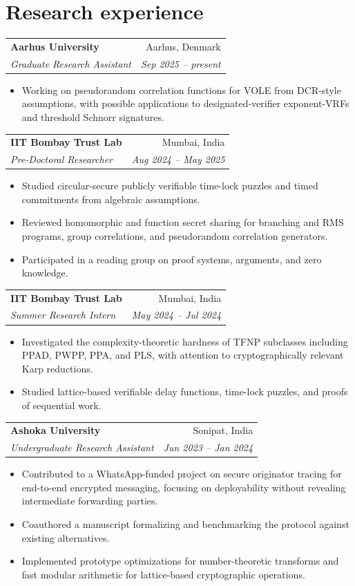 \documentclass[10pt,a4paper]{article}
\makeatletter
\newcommand{\cvheading}[4]{%
  \begin{tabular*}{\textwidth}{@{\extracolsep{\fill}} l r}
    \textbf{#1} & #2 \\
    \emph{#3} & \emph{#4}
  \end{tabular*}
  \vspace{-0.35em}
}
\makeatother
\begin{document}
\section*{Research experience}
\cvheading{Aarhus University}{Aarhus, Denmark}{Graduate Research Assistant}{Sep 2025 -- present}
\begin{itemize}
  \item Working on pseudorandom correlation functions for VOLE from DCR-style assumptions, with possible applications to designated-verifier exponent-VRFs and threshold Schnorr signatures.
\end{itemize}

\cvheading{IIT Bombay Trust Lab}{Mumbai, India}{Pre-Doctoral Researcher}{Aug 2024 -- May 2025}
\begin{itemize}
  \item Studied circular-secure publicly verifiable time-lock puzzles and timed commitments from algebraic assumptions.
  \item Reviewed homomorphic and function secret sharing for branching and RMS programs, group correlations, and pseudorandom correlation generators.
  \item Participated in a reading group on proof systems, arguments, and zero knowledge.
\end{itemize}

\cvheading{IIT Bombay Trust Lab}{Mumbai, India}{Summer Research Intern}{May 2024 -- Jul 2024}
\begin{itemize}
  \item Investigated the complexity-theoretic hardness of TFNP subclasses including PPAD, PWPP, PPA, and PLS, with attention to cryptographically relevant Karp reductions.
  \item Studied lattice-based verifiable delay functions, time-lock puzzles, and proofs of sequential work.
\end{itemize}

\cvheading{Ashoka University}{Sonipat, India}{Undergraduate Research Assistant}{Jun 2023 -- Jan 2024}
\begin{itemize}
  \item Contributed to a WhatsApp-funded project on secure originator tracing for end-to-end encrypted messaging, focusing on deployability without revealing intermediate forwarding parties.
  \item Coauthored a manuscript formalizing and benchmarking the protocol against existing alternatives.
  \item Implemented prototype optimizations for number-theoretic transforms and fast modular arithmetic for lattice-based cryptographic operations.
\end{itemize}
\end{document}
